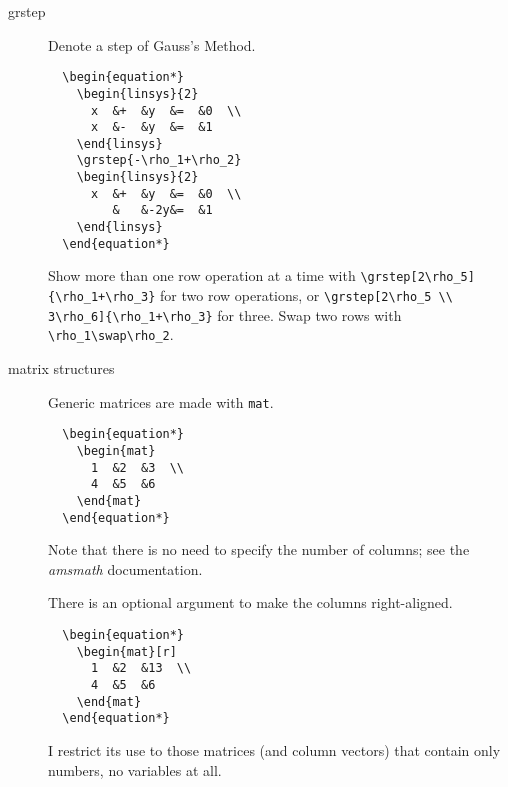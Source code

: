 \documentclass[titlepage]{article}
\begin{document}
\begin{description}
\item[grstep]
  Denote a step of Gauss's Method.
\begin{verbatim}
  \begin{equation*}
    \begin{linsys}{2}
      x  &+  &y  &=  &0  \\
      x  &-  &y  &=  &1
    \end{linsys}
    \grstep{-\rho_1+\rho_2}
    \begin{linsys}{2}
      x  &+  &y  &=  &0  \\
         &   &-2y&=  &1
    \end{linsys}
  \end{equation*}
\end{verbatim}
  Show more than one row operation at a time with
  \verb|\grstep[2\rho_5]{\rho_1+\rho_3}| for two row operations,
  or \verb|\grstep[2\rho_5 \\ 3\rho_6]{\rho_1+\rho_3}| for three.
  Swap two rows with \verb|\rho_1\swap\rho_2|.
  
\item[matrix structures]
Generic matrices are made with \verb|mat|. 
\begin{verbatim}
  \begin{equation*}
    \begin{mat}
      1  &2  &3  \\
      4  &5  &6 
    \end{mat}
  \end{equation*}
\end{verbatim}
  Note that there is no need to specify the number of columns;
  see the \textit{amsmath} documentation.

  There is an optional argument to make the columns right-aligned.
\begin{verbatim}
  \begin{equation*}
    \begin{mat}[r]
      1  &2  &13  \\
      4  &5  &6 
    \end{mat}
  \end{equation*}
\end{verbatim}
I restrict its use to those matrices (and column vectors) that contain
only numbers, no variables at all.


\end{description}
\end{document}
